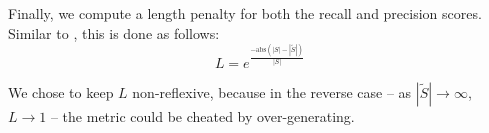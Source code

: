 Finally, we compute a length penalty for both the recall and precision scores. Similar to \textcite{Fu2021DOC2PPTAP}, this is done as follows:
\begin{equation}
    L = e^{\frac{-\mathrm{abs}(|S| - |\tilde{S}|)}{|S|}}
\end{equation}

\noindent We chose to keep $L$ non-reflexive, because in the reverse case -- as $|\tilde{S}| \rightarrow \infty$, $L \rightarrow 1$ -- the metric could be cheated by over-generating.

